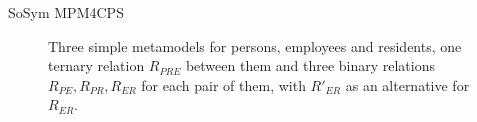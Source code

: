 \begin{copiedFrom}{SoSym MPM4CPS}
\begin{figure}
    \centering
    
    \caption{Three simple metamodels for persons, employees and residents, one ternary relation $R_{PRE}$ between them and three binary relations $R_{PE}, R_{PR}, R_{ER}$ for each pair of them, with $R'_{ER}$ as an alternative for $R_{ER}$.}
    \label{fig:prologue:three_persons_example}
\end{figure}


\end{copiedFrom}
